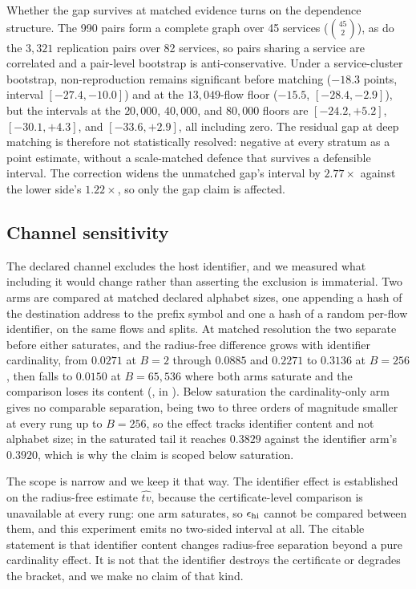 Whether the gap survives at matched evidence turns on the dependence structure.
The 990 pairs form a complete graph over 45 services ($\binom{45}{2}$), as do the
$3{,}321$ replication pairs over 82 services, so pairs sharing a service are
correlated and a pair-level bootstrap is anti-conservative. Under a
service-cluster bootstrap, non-reproduction remains significant before matching
($-18.3$ points, interval $[-27.4,-10.0]$) and at the $13{,}049$-flow floor
($-15.5$, $[-28.4,-2.9]$), but the intervals at the $20{,}000$, $40{,}000$, and
$80{,}000$ floors are $[-24.2,+5.2]$, $[-30.1,+4.3]$, and $[-33.6,+2.9]$, all
including zero. The residual gap at deep matching is therefore not statistically
resolved: negative at every stratum as a point estimate, without a scale-matched
defence that survives a defensible interval. The correction widens the unmatched
gap's interval by $2.77\times$ against the lower side's $1.22\times$, so only the
gap claim is affected.

\subsection{Channel sensitivity}
\label{sec:discussion/sensitivity}

The declared channel excludes the host identifier, and we measured what
including it would change rather than asserting the exclusion is immaterial. Two
arms are compared at matched declared alphabet sizes, one appending a hash of the
destination address to the prefix symbol and one a hash of a random per-flow
identifier, on the same flows and splits. At matched resolution the two separate
before either saturates, and the radius-free difference grows with identifier
cardinality, from $0.0271$ at $B{=}2$ through $0.0885$ and $0.2271$ to $0.3136$
at $B{=}256$, then falls to $0.0150$ at $B{=}65{,}536$ where both arms saturate
and the comparison loses its content (, in ). Below saturation
the cardinality-only arm gives no comparable separation, being two to three
orders of magnitude smaller at every rung up to $B{=}256$, so the effect tracks
identifier content and not alphabet size; in the saturated tail it reaches
$0.3829$ against the identifier arm's $0.3920$, which is why the claim is scoped
below saturation.

The scope is narrow and we keep it that way. The identifier effect is
established on the radius-free estimate $\widehat{tv}$, because the
certificate-level comparison is unavailable at every rung: one arm saturates, so
$\epsilon_{\mathrm{hi}}$ cannot be compared between them, and this experiment emits no
two-sided interval at all. The citable statement is that
identifier content changes radius-free separation beyond a pure cardinality
effect. It is not that the identifier destroys the certificate or degrades the
bracket, and we make no claim of that kind.

